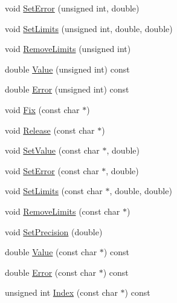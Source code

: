 \begin{DoxyCompactItemize}
\item 
void \mbox{\hyperlink{classROOT_1_1Minuit2_1_1MnApplication_a04e02c59439b7c638cea29938030b2f8}{Set\+Error}} (unsigned int, double)
\item 
void \mbox{\hyperlink{classROOT_1_1Minuit2_1_1MnApplication_ad6c07174e01b117cb67a43211753ae06}{Set\+Limits}} (unsigned int, double, double)
\item 
void \mbox{\hyperlink{classROOT_1_1Minuit2_1_1MnApplication_a2c99043d2263ae51967867e1a26d4e30}{Remove\+Limits}} (unsigned int)
\item 
double \mbox{\hyperlink{classROOT_1_1Minuit2_1_1MnApplication_a408778c8cf19fe7bdf443a9d51389d66}{Value}} (unsigned int) const
\item 
double \mbox{\hyperlink{classROOT_1_1Minuit2_1_1MnApplication_aedc3775627672ba2038e8a26d6df13f1}{Error}} (unsigned int) const
\item 
void \mbox{\hyperlink{classROOT_1_1Minuit2_1_1MnApplication_aa678010fc292b1d0f4cb1761b13104c4}{Fix}} (const char $\ast$)
\item 
void \mbox{\hyperlink{classROOT_1_1Minuit2_1_1MnApplication_a399bc86275d6ea481911be4a4b48d83c}{Release}} (const char $\ast$)
\item 
void \mbox{\hyperlink{classROOT_1_1Minuit2_1_1MnApplication_af8376fc6c9a727c8f3dbdc268afb0e7e}{Set\+Value}} (const char $\ast$, double)
\item 
void \mbox{\hyperlink{classROOT_1_1Minuit2_1_1MnApplication_ac47d9b0517cbc38dc0237e4dc654a807}{Set\+Error}} (const char $\ast$, double)
\item 
void \mbox{\hyperlink{classROOT_1_1Minuit2_1_1MnApplication_a7c5404de0cf4efac550bea31f3cd4088}{Set\+Limits}} (const char $\ast$, double, double)
\item 
void \mbox{\hyperlink{classROOT_1_1Minuit2_1_1MnApplication_ae33804b5db979701f0f86b88b4124dd0}{Remove\+Limits}} (const char $\ast$)
\item 
void \mbox{\hyperlink{classROOT_1_1Minuit2_1_1MnApplication_a054caa9f6e7b2617c182b6b43b97c900}{Set\+Precision}} (double)
\item 
double \mbox{\hyperlink{classROOT_1_1Minuit2_1_1MnApplication_a0848e9b8eb22d5b23b6ba01ddcf8c135}{Value}} (const char $\ast$) const
\item 
double \mbox{\hyperlink{classROOT_1_1Minuit2_1_1MnApplication_a6997e4fd745e4048609c697f74c92eb8}{Error}} (const char $\ast$) const
\item 
unsigned int \mbox{\hyperlink{classROOT_1_1Minuit2_1_1MnApplication_a6b6e2bc386692b9e3cd8a9ad01fc175e}{Index}} (const char $\ast$) const

\end{DoxyCompactItemize}
